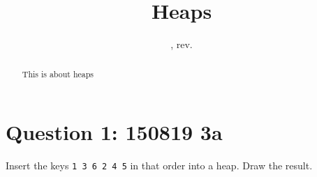 \documentclass{tufte-handout}
\title{Heaps}
\author{}
\date{\GITAuthorDate, rev. \GITAbrHash}
\begin{document}
\maketitle

\begin{abstract}
  This is about heaps
\end{abstract}

\section{\textbf{Question 1}: 150819 3a}
Insert the keys {\tt 1 3 6 2 4 5} in that order into a heap. Draw the result.
\end{document}
